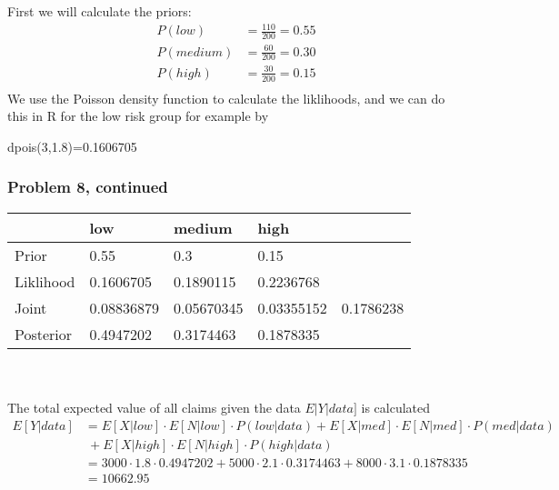 \documentclass[12pt]{article}
\theoremstyle{definition}
\begin{document}
First we will calculate the priors:
\begin{align*}
P(low) &= \frac{110}{200} = 0.55\\
P(medium) &= \frac{60}{200} = 0.30\\
P(high) &= \frac{30}{200} = 0.15\\
\end{align*}
We use the Poisson density function to calculate the liklihoods, and we can do this in R for the low risk group for example by
\begin{verbatim*}
dpois(3,1.8)=0.1606705
\end{verbatim*}

\newpage
\subsubsection*{Problem 8, continued}
\begin{tabular}{lllll}
&   low   &   medium   &   high   \\
\hline
Prior      &   0.55   &   0.3   &   0.15   &\\
Liklihood  &   0.1606705   &   0.1890115   &   0.2236768   &\\
Joint      &   0.08836879   &   0.05670345   &   0.03355152   &   0.1786238\\
Posterior  &   0.4947202   &   0.3174463   &   0.1878335   &\\
\hline
\end{tabular}
\\\\
The total expected value of all claims given the data $E|Y|data]$ is calculated
\begin{align*}
E[Y|data] &= E[X|low] \cdot E[N|low] \cdot P(low|data) + E[X|med] \cdot E[N|med] \cdot P(med|data)\\
&\ + E[X|high] \cdot E[N|high] \cdot P(high|data)\\
&= 3000 \cdot 1.8 \cdot 0.4947202 + 5000 \cdot 2.1 \cdot 0.3174463 + 8000 \cdot 3.1 \cdot 0.1878335\\
&= 10662.95
\end{align*}
\end{document}
